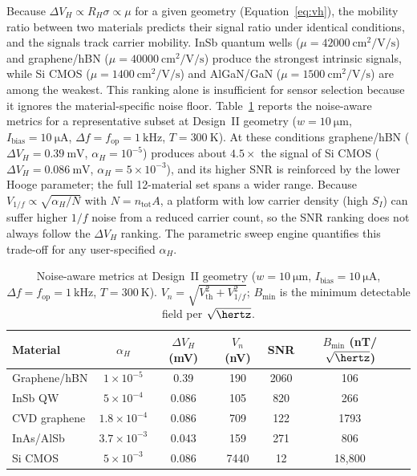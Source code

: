 \documentclass[micromachines,article,submit,pdftex,moreauthors]{Definitions/mdpi}
\begin{document}
Because $\Delta V_H \propto R_H \sigma \propto \mu$ for a given geometry
(Equation~\eqref{eq:vh}), the mobility ratio between two materials predicts their
signal ratio under identical conditions, and the signals track carrier mobility. InSb
quantum wells ($\mu = \SI{42000}{\centi\meter\squared\per\volt\per\second}$) and
graphene/hBN ($\mu = \SI{40000}{\centi\meter\squared\per\volt\per\second}$) produce
the strongest intrinsic signals, while Si CMOS
($\mu = \SI{1400}{\centi\meter\squared\per\volt\per\second}$) and AlGaN/GaN
($\mu = \SI{1500}{\centi\meter\squared\per\volt\per\second}$) are among the weakest.
This ranking alone is insufficient for sensor selection because it ignores the
material-specific noise floor. Table~\ref{tab:noise} reports the noise-aware metrics
for a representative subset at Design~II geometry ($w = \SI{10}{\micro\meter}$,
$I_\text{bias} = \SI{10}{\micro\ampere}$, $\Delta f = f_\text{op} = \SI{1}{\kilo\hertz}$,
$T = \SI{300}{\kelvin}$). At these conditions graphene/hBN
($\Delta V_H = \SI{0.39}{\milli\volt}$, $\alpha_H = 10^{-5}$) produces about
$4.5\times$ the signal of Si CMOS ($\Delta V_H = \SI{0.086}{\milli\volt}$,
$\alpha_H = 5\times10^{-3}$), and its higher SNR is reinforced by the lower Hooge
parameter; the full 12-material set spans a wider range. Because
$V_{1/f} \propto \sqrt{\alpha_H / N}$ with $N = n_\text{tot} A$, a platform with low
carrier density (high $S_I$) can suffer higher $1/f$ noise from a reduced carrier
count, so the SNR ranking does not always follow the $\Delta V_H$ ranking. The
parametric sweep engine quantifies this trade-off for any user-specified $\alpha_H$.

\begin{table}[H]
\caption{Noise-aware metrics at Design~II geometry
($w = \SI{10}{\micro\meter}$, $I_\text{bias} = \SI{10}{\micro\ampere}$,
$\Delta f = f_\text{op} = \SI{1}{\kilo\hertz}$, $T = \SI{300}{\kelvin}$).
$V_n = \sqrt{V_\text{th}^2 + V_{1/f}^2}$;
$B_\text{min}$ is the minimum detectable field per $\sqrt{\hertz}$.\label{tab:noise}}
\begin{tabularx}{\textwidth}{Xcccccc}
\toprule
\textbf{Material} & \boldmath$\alpha_H$ &
\textbf{\boldmath$\Delta V_H$ (mV)} & \textbf{\boldmath$V_n$ (nV)} &
\textbf{SNR} & \textbf{\boldmath$B_\text{min}$ (nT/$\sqrt{\hertz}$)} \\
\midrule
Graphene/hBN  & $1\times10^{-5}$   & 0.39  & 190   & 2060 & 106 \\
InSb QW       & $5\times10^{-4}$   & 0.086 & 105   & 820  & 266 \\
CVD graphene  & $1.8\times10^{-4}$ & 0.086 & 709   & 122  & 1793 \\
InAs/AlSb     & $3.7\times10^{-3}$ & 0.043 & 159   & 271  & 806 \\
Si CMOS       & $5\times10^{-3}$   & 0.086 & 7440  & 12   & 18{,}800 \\
\bottomrule
\end{tabularx}
\end{table}
\end{document}
